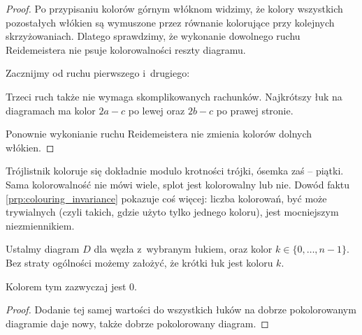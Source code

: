 \begin{proof}
    Po przypisaniu kolorów górnym włóknom widzimy, że kolory wszystkich pozostałych włókien są wymuszone przez równanie kolorujące przy kolejnych skrzyżowaniach.
    Dlatego sprawdzimy, że wykonanie dowolnego ruchu Reidemeistera nie psuje kolorowalności reszty diagramu.
    
    Zacznijmy od ruchu pierwszego i~drugiego:

    Trzeci ruch także nie wymaga skomplikowanych rachunków.
    Najkrótszy łuk na diagramach ma kolor $2a-c$ po lewej oraz $2b-c$ po prawej stronie.

    Ponownie wykonianie ruchu Reidemeistera nie zmienia kolorów dolnych włókien.
\end{proof}

Trójlistnik koloruje się dokładnie modulo krotności trójki, ósemka zaś -- piątki.
Sama kolorowalność nie mówi wiele, splot jest kolorowalny lub nie.
Dowód faktu \ref{prp:colouring_invariance} pokazuje coś więcej: liczba kolorowań, być może trywialnych (czyli takich, gdzie użyto tylko jednego koloru), jest mocniejszym niezmiennikiem.

\begin{lemma}
\label{lem:colouring_arc}%
    Ustalmy diagram $D$ dla węzła z~wybranym łukiem, oraz kolor $k \in \{0, \ldots, n - 1\}$.
    Bez straty ogólności możemy założyć, że krótki łuk jest koloru $k$.
\end{lemma}

Kolorem tym zazwyczaj jest $0$.

\begin{proof}
    Dodanie tej samej wartości do wszystkich łuków na dobrze pokolorowanym diagramie daje nowy, także dobrze pokolorowany diagram.
\end{proof}

